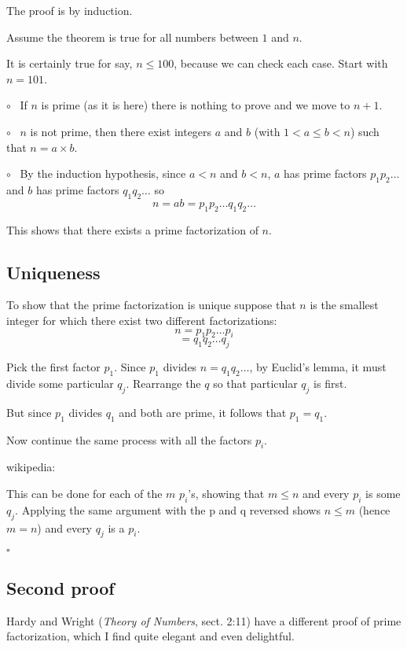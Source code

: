 \documentclass[11pt, oneside]{article}
\begin{document}
The proof is by induction.

Assume the theorem is true for all numbers between $1$ and $n$.  

It is certainly true for say, $n \le 100$, because we can check each case.  Start with $n = 101$.

$\circ$ \ If $n$ is prime (as it is here) there is nothing to prove and we move to $n + 1$.  

$\circ$ \  $n$ is not prime, then there exist integers $a$ and $b$ (with $1 < a \le b < n$) such that $n = a \times b$.

$\circ$ \ By the induction hypothesis, since $a < n$ and $b < n$, $a$ has prime factors $p_1 p_2 \dots$ and $b$ has prime factors $q_1 q_2 \dots$ so
\[ n = ab = p_1 p_2 \dots q_1 q_2 \dots \]

This shows that there exists a prime factorization of $n$.

\subsection*{Uniqueness}

To show that the prime factorization is unique suppose that $n$ is the smallest integer for which there exist two different factorizations:
\[ n = p_1 p_2 \dots p_i \]
\[ = q_1 q_2 \dots q_j \]
    
Pick the first factor $p_1$.  Since $p_1$ divides $n = q_1 q_2 \dots$, by Euclid's lemma, it must divide some particular $q_j$.  Rearrange the $q$ so that particular $q_j$ is first.

But since $p_1$ divides $q_1$ and both are prime, it follows that $p_1 = q_1$. 

Now continue the same process with all the factors $p_i$.

wikipedia:

    This can be done for each of the $m$ $p_i$'s, showing that $m \le n$ and every $p_i$ is some $q_j$. Applying the same argument with the p and q reversed shows $n \le m$ (hence $m = n$) and every $q_j$ is a $p_i$.
    
$\square$
    
\subsection*{Second proof}

Hardy and Wright (\emph{Theory of Numbers}, sect. 2:11) have a different proof of prime factorization, which I find quite elegant and even delightful.
\end{document}
